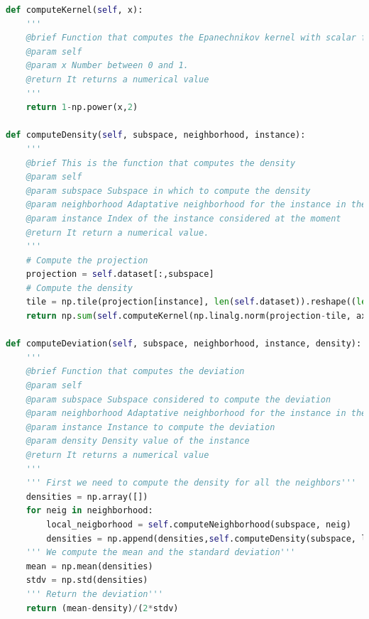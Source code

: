 \begin{lstlisting}[language=Python]
def computeKernel(self, x):
	'''
	@brief Function that computes the Epanechnikov kernel with scalar factor 1
	@param self
	@param x Number between 0 and 1.
	@return It returns a numerical value
	'''
	return 1-np.power(x,2)

def computeDensity(self, subspace, neighborhood, instance):
	'''
	@brief This is the function that computes the density
	@param self
	@param subspace Subspace in which to compute the density
	@param neighborhood Adaptative neighborhood for the instance in the subspace
	@param instance Index of the instance considered at the moment
	@return It return a numerical value.
	'''
	# Compute the projection
	projection = self.dataset[:,subspace]
	# Compute the density
	tile = np.tile(projection[instance], len(self.dataset)).reshape((len(self.dataset),len(projection[instance])))
	return np.sum(self.computeKernel(np.linalg.norm(projection-tile, axis=1))/self.computeEpsilon(subspace))/len(self.dataset)

def computeDeviation(self, subspace, neighborhood, instance, density):
	'''
	@brief Function that computes the deviation
	@param self
	@param subspace Subspace considered to compute the deviation
	@param neighborhood Adaptative neighborhood for the instance in the subspace
	@param instance Instance to compute the deviation
	@param density Density value of the instance
	@return It returns a numerical value
	'''
	''' First we need to compute the density for all the neighbors'''
	densities = np.array([])
	for neig in neighborhood:
		local_neigborhood = self.computeNeighborhood(subspace, neig)
		densities = np.append(densities,self.computeDensity(subspace, local_neigborhood, neig))
	''' We compute the mean and the standard deviation'''
	mean = np.mean(densities)
	stdv = np.std(densities)
	''' Return the deviation'''
	return (mean-density)/(2*stdv)


\end{lstlisting}
